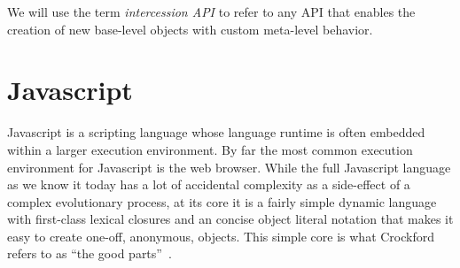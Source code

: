 \documentclass{sig-alternate}
\begin{document}
We will use the term \emph{intercession API} to refer to any API that enables the creation of new base-level objects with custom meta-level behavior.




\section{Javascript}

Javascript is a scripting language whose language runtime is often embedded within a larger execution environment. By far the most common execution environment for Javascript is the web browser. While the full Javascript language as we know it today has a lot of accidental complexity as a side-effect of a complex evolutionary process, at its core it is a fairly simple dynamic language with first-class lexical closures and an concise object literal notation that makes it easy to create one-off, anonymous, objects. This simple core is what Crockford refers to as ``the good parts''~\cite{crockford08good}.
\end{document}
